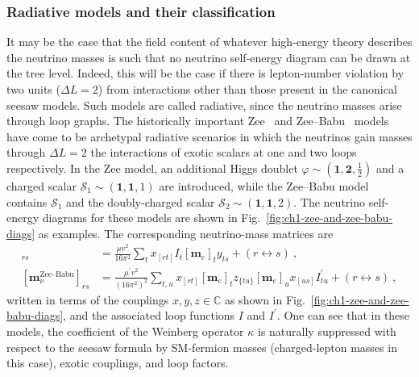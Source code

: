 \subsubsection{Radiative models and their classification}

It may be the case that the field content of whatever high-energy theory
describes the neutrino masses is such that no neutrino self-energy diagram can
be drawn at the tree level. Indeed, this will be the case if there is
lepton-number violation by two units ($\Delta L = 2$) from interactions other
than those present in the canonical seesaw models. Such models are called
radiative, since the neutrino masses arise through loop graphs. The historically
important Zee~\cite{Zee:1980ai} and Zee--Babu~\cite{Zee:1985id, Babu:1988ki}
models have come to be archetypal radiative scenarios in which the neutrinos
gain masses through $\Delta L = 2$ the interactions of exotic scalars at one and
two loops respectively. In the Zee model, an additional Higgs doublet
$\varphi \sim (\mathbf{1}, \mathbf{2}, \tfrac{1}{2})$ and a charged scalar
$\mathcal{S}_{1} \sim (\mathbf{1}, \mathbf{1}, 1)$ are introduced, while the
Zee--Babu model contains $\mathcal{S}_{1}$ and the doubly-charged scalar
$\mathcal{S}_{2} \sim (\mathbf{1}, \mathbf{1}, 2)$. The neutrino self-energy
diagrams for these models are shown in Fig.~\ref{fig:ch1-zee-and-zee-babu-diags} as
examples. The corresponding neutrino-mass matrices are
\begin{align}
  [\mathbf{m}^{\text{Zee}}_\nu]_{rs} & = \frac{\mu v^2}{16\pi^2} \sum_t x_{[rt]} I_{t} [\mathbf{m}_e]_t y_{ts} + (r \leftrightarrow s) \ , \label{eq:ch1-zee-mv} \\
  [\mathbf{m}^{\text{Zee--Babu}}_\nu]_{rs} & = \frac{\mu^{\prime} v^2}{(16 \pi^2)^2} \sum_{t,u} x_{[rt]} [\mathbf{m}_e]_t z_{\{tu\}} [\mathbf{m}_e]_u x_{[us]} I^\prime_{tu} + (r \leftrightarrow s) \ , \label{eq:ch1-zee-babu-mv}
\end{align}
written in terms of the couplings $x,y,z \in \mathbb{C}$ as shown in
Fig.~\ref{fig:ch1-zee-and-zee-babu-diags}, and the associated loop functions $I$ and
$I^{\prime}$. One can see that in these models, the coefficient of the Weinberg
operator $\kappa$ is naturally suppressed with respect to the seesaw formula by
SM-fermion masses (charged-lepton masses in this case), exotic couplings, and
loop factors.

